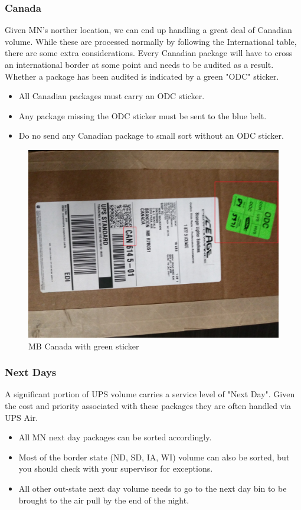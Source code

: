 \documentclass[12pt]{article}
\begin{document}
\subsubsection{Canada}
Given MN's norther location, we can end up handling a great deal of Canadian volume. While these are processed normally by following the International table, there are some extra considerations. Every Canadian package will have to cross an international border at some point and needs to be audited as a result. Whether a package has been audited is indicated by a green "ODC" sticker.

\begin{itemize}
    \item All Canadian packages must carry an ODC sticker.
    \item Any package missing the ODC sticker must be sent to the blue belt.
    \item Do no send any Canadian package to small sort without an ODC sticker.
\end{itemize}

\begin{figure}[H]
    \centering
    \includegraphics[angle=90,width=0.4\linewidth]{20171221_163826}
    \caption{MB Canada with green sticker}
\end{figure}

\subsubsection{Next Days}
A significant portion of UPS volume carries a service level of "Next Day". Given the cost and priority associated with these packages they are often handled via UPS Air. 

\begin{itemize}
    \item All MN next day packages can be sorted accordingly.
    \item Most of the border state (ND, SD, IA, WI) volume can also be sorted, but you should check with your supervisor for exceptions.
    \item All other out-state next day volume needs to go to the next day bin to be brought to the air pull by the end of the night.
\end{itemize}
\end{document}

